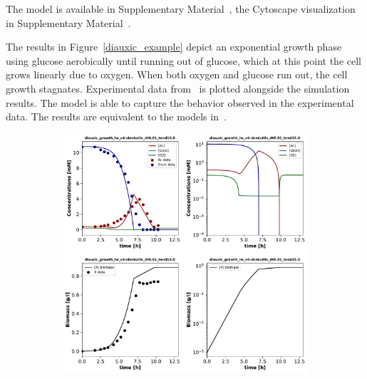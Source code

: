 \documentclass{bioinfo}
\begin{document}
The model is available in Supplementary Material~, the Cytoscape visualization in Supplementary Material~.

The results in Figure~\ref{diauxic_example} depict an exponential growth phase using glucose aerobically until running out of glucose, which at this point the cell grows linearly due to oxygen. When both oxygen and glucose run out, the cell growth stagnates. Experimental data from~\citep{DFBA} is plotted alongside the simulation results. The model is able to capture the behavior observed in the experimental data. The results are equivalent to the models in~\citep{DFBA_ECOLI}.

\begin{figure}[!t]
\begin{subfigure}[t]{0.5\textwidth}	\centerline{\includegraphics[width=\linewidth]{figures/Fig5_diauxic_growth_lw_v4-sbmlutils_dt0_01_tend15_0.pdf}}


\end{subfigure}
\end{figure}
\end{document}
